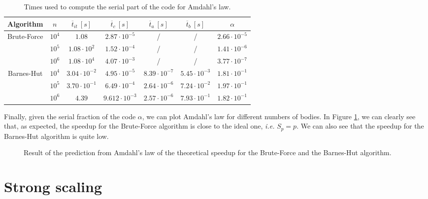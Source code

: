 \documentclass[10pt,a4paper]{article}
\begin{document}
\begin{table}[h]
\centering
\begin{tabular}{|c||c|c|c|c|c||c|}
\hline
Algorithm & $n$ & $\overline{t}_{it}~[s]$ & $\overline{t}_{c}~[s]$ & $\overline{t}_{a}~[s]$ & $\overline{t}_{b}~[s]$ & $\alpha$ \\
\hline \hline
\multirow{3}{*}{Brute-Force} & $10^4$ & $1.08$ & $2.87\cdot 10^{-5}$ & / & / & $2.66\cdot10^{-5}$ \\ \cline{2-7}
& $10^5$ & $1.08\cdot10^2$ & $1.52\cdot 10^{-4}$ & / & / & $1.41\cdot10^{-6}$ \\ \cline{2-7}
& $10^6$ & $1.08\cdot10^4$ & $4.07\cdot 10^{-3}$ & / & / & $3.77\cdot10^{-7}$ \\ \hline \hline
\multirow{3}{*}{Barnes-Hut} & $10^4$ & $3.04\cdot10^{-2}$ & $4.95\cdot 10^{-5}$ & $8.39\cdot10^{-7}$ & $5.45\cdot10^{-3}$ & $1.81\cdot10^{-1}$ \\ \cline{2-7}
& $10^5$ & $3.70\cdot10^{-1}$ & $6.49\cdot10^{-4}$ & $2.64\cdot10^{-6}$ & $7.24\cdot10^{-2}$ & $1.97\cdot10^{-1}$ \\ \cline{2-7}
& $10^6$ & $4.39$ & $9.612\cdot10^{-3}$ & $2.57\cdot10^{-6}$ & $7.93\cdot10^{-1}$ & $1.82\cdot10^{-1}$ \\ \hline
\end{tabular}
   \caption{Times used to compute the serial part of the code for Amdahl's law.}
   \label{tab:amdahl}  
\end{table}

Finally, given the serial fraction of the code $\alpha$, we can plot Amdahl's law for different numbers of bodies. In Figure \ref{fig:amdahl}, we can clearly see that, as expected, the speedup for the Brute-Force algorithm is close to the ideal one, {\it i.e.} $S_p=p$. We can also see that the speedup for the Barnes-Hut algorithm is quite low. 

\begin{figure}[H]
\centering

\caption{\label{fig:amdahl} Result of the  prediction from Amdahl's law of the theoretical speedup for the Brute-Force and the Barnes-Hut algorithm.}
\end{figure}

\section{Strong scaling}
\end{document}
